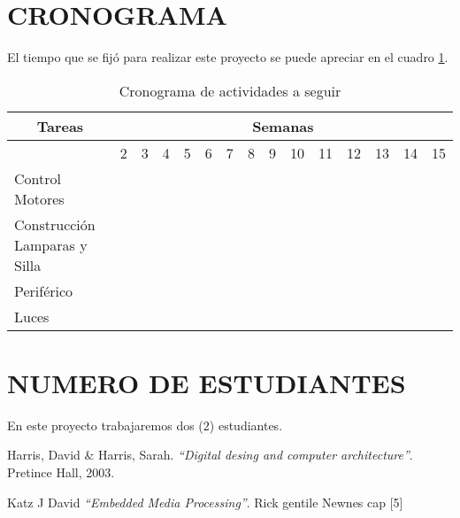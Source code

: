 \documentclass[10pt,graphicx,caption,rotating]{article}
\begin{document}
\section{CRONOGRAMA}
\noindent
El tiempo que se fijó para realizar este proyecto se puede apreciar en el cuadro \ref{tab1}.

\begin{table}[H]
	\centering
\begin{tabular}{|l|c|c|c|c|c|c|c|c|c|c|c|c|c|c|}\hline
\multicolumn{1}{|c|}{Tareas} & \multicolumn{14}{|c|}{Semanas} \\ \hline
 & 2 & 3 & 4 & 5 & 6 & 7 & 8 & 9 & 10 & 11 & 12 & 13 & 14 & 15 \\ \hline
Control Motores & & & & & & & & \cellcolor{black} & \cellcolor{black} & & & & & \\ \hline
Construcción Lamparas y Silla & & & & & & & & & \cellcolor{black} & \cellcolor{black} & \cellcolor{black} & & & \\ \hline
Periférico & & & & & & & & & & & \cellcolor{black} & \cellcolor{black} & & \\ \hline
Luces & & & & & & & & & & & & \cellcolor{black} & \cellcolor{black}  & \\ \hline
    \end{tabular}
	\caption{Cronograma de actividades a seguir}
	\label{tab1}
\end{table}

\section{NUMERO DE ESTUDIANTES}
\noindent
En este proyecto trabajaremos dos ($2$) estudiantes.
  
\begin{thebibliography}{99}
 Harris, David \& Harris, Sarah.
{\em "`Digital desing and computer architecture"'}.
Pretince Hall, 2003.

 Katz J David
{\em "`Embedded Media Processing"'}.
Rick gentile Newnes cap [5]
\end{thebibliography}
\end{document}
